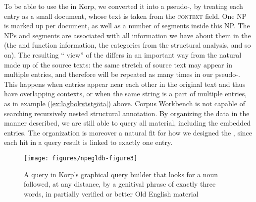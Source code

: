 \documentclass[output=paper,colorlinks,citecolor=brown]{langscibook}
\begin{document}
To be able to use the  in Korp, we converted it into a pseudo-, by treating each entry as a small document, whose text is taken from the \textsc{context} field. One NP is marked up per document, as well as a number of segments inside this NP. The NPs and segments are associated with all information we have about them in the  (the  and function information, the categories from the structural analysis, and so on). The resulting `` view'' of the  differs in an important way from the natural  made up of the source texts: the same stretch of source text may appear in multiple entries, and therefore will be repeated as many times in our pseudo-. This happens when entries appear near each other in the original text and thus have overlapping contexts, or when the same string is a part of multiple entries, as in example (\ref{ex:lagbokvästgöta}) above. Corpus Workbench is not capable of searching recursively nested structural annotation. By organizing the data in the manner described, we are still able to query all material, including the embedded entries. The organization is moreover a natural fit for how we designed the , since each hit in a query result is linked to exactly one entry.\largerpage

\begin{figure}[tb]
\texttt{[image: figures/npegldb-figure3]}
\caption{A query in Korp's graphical query builder that looks for a noun followed, at any distance, by a genitival phrase of exactly three words, in partially verified or better Old English material\label{fig:korp}}
\end{figure}
\end{document}
